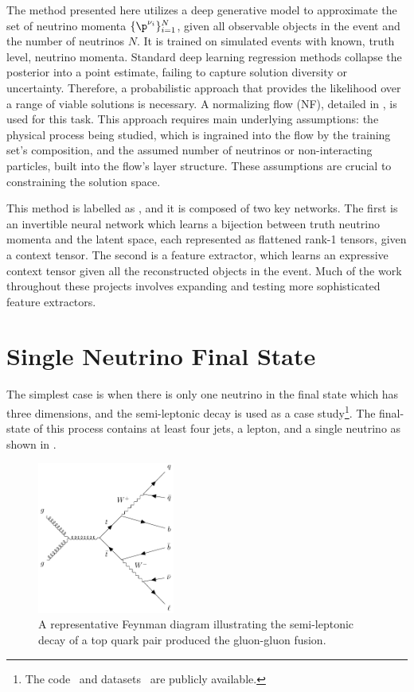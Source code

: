The method presented here utilizes a deep generative model to approximate the set of neutrino momenta $\{\p^{\nu_i}\}_{i=1}^N$, given all observable objects in the event and the number of neutrinos $N$.
It is trained on simulated events with known, truth level, neutrino momenta.
Standard deep learning regression methods collapse the posterior into a point estimate, failing to capture solution diversity or uncertainty.
Therefore, a probabilistic approach that provides the likelihood over a range of viable solutions is necessary.
A normalizing flow (NF), detailed in , is used for this task.
This approach requires main underlying assumptions: the physical process being studied, which is ingrained into the flow by the training set's composition, and the assumed number of neutrinos or non-interacting particles, built into the flow's layer structure.
These assumptions are crucial to constraining the solution space.

This method is labelled as \vvflows, and it is composed of two key networks.
The first is an invertible neural network which learns a bijection between truth neutrino momenta and the latent space, each represented as flattened rank-1 tensors, given a context tensor.
The second is a feature extractor, which learns an expressive context tensor given all the reconstructed objects in the event.
Much of the work throughout these projects involves expanding and testing more sophisticated feature extractors.

\section{Single Neutrino Final State}

The simplest case is when there is only one neutrino in the final state which has three dimensions, and the semi-leptonic \ttbar decay is used as a case study\footnote{The code~\cite{SemileptonicTtbarNeutrino} and datasets~\cite{NuFlowsCode} are publicly available.}.
The final-state of this process contains at least four jets, a lepton, and a single neutrino as shown in .

\begin{figure}[ht]
    \center
    \includegraphics[width=0.4\textwidth]{Figures/neutrino_unfolding/feynman.pdf}
    \caption{A representative Feynman diagram illustrating the semi-leptonic decay of a top quark pair produced the gluon-gluon fusion.}
    \label{fig:feynman}
\end{figure}

